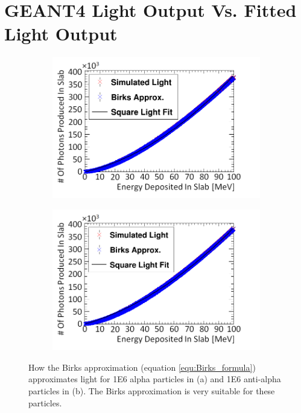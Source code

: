 
\chapter{GEANT4 Light Output Vs. Fitted Light Output}

\begin{figure}[htbp]
\centering
\begin{subfigure}{.49\textwidth}
  \centering
  \includegraphics[width=\linewidth]{Appendix5/newNewFigs/alphaBirksSlab_simAndApproxLight.png}
  \captionsetup{width=.9\linewidth}
  \caption{}
  \label{subfig:append5_light_of_Alphas0-100mev}
\end{subfigure}
\begin{subfigure}{.49\textwidth}
  \centering
  \includegraphics[width=\linewidth]{Appendix5/newNewFigs/aAlphaBirksSlab_simAndApproxLight.png}
  \captionsetup{width=.9\linewidth}
  \caption{}
  \label{subfig:append5_light_of_AAlphas0-100mev}
\end{subfigure}
\caption[Birks' light approximation for alpha particles compared to simulation.]{How the Birks approximation (equation \ref{equ:Birks_formula}) approximates light for 1E6 alpha particles in (a) and 1E6 anti-alpha particles in (b). The Birks approximation is very suitable for these particles.}
\label{fig:append5_light_of_Alphas_AAlphas0-100mev}
\end{figure}

